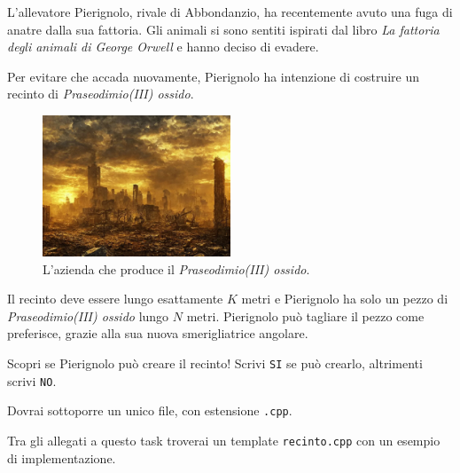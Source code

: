 \usepackage{xcolor}
\usepackage{afterpage}
\usepackage{pifont,mdframed}
\usepackage[bottom]{footmisc}
\usepackage{minted}

\newcommand{\inputfile}{\texttt{stdin}}
\newcommand{\outputfile}{\texttt{stdout}}
\makeatletter
\renewcommand{\this@inputfilename}{\texttt{stdin}}
\renewcommand{\this@outputfilename}{\texttt{stdout}}
\renewcommand{\this@syllabuslevel}{5}
\renewcommand{\this@custdifficulty}{3}
\makeatother
{}

L'allevatore Pierignolo, rivale di Abbondanzio, ha recentemente avuto una fuga di anatre dalla sua fattoria.
Gli animali si sono sentiti ispirati dal libro \textit{La fattoria degli animali di George Orwell} e hanno
deciso di evadere.

Per evitare che accada nuovamente, Pierignolo ha intenzione di costruire un recinto di \textit{Praseodimio(III) ossido}.

\begin{figure}[h]
    \centering
    \includegraphics[width=0.5\textwidth]{toxic.png}
    \caption{L'azienda che produce il \textit{Praseodimio(III) ossido}.}
\end{figure}

Il recinto deve essere lungo esattamente $K$ metri e Pierignolo ha solo un pezzo di \textit{Praseodimio(III) ossido} lungo $N$ metri.
Pierignolo può tagliare il pezzo come preferisce, grazie alla sua nuova smerigliatrice angolare.

Scopri se Pierignolo può creare il recinto! Scrivi \texttt{SI} se può crearlo, altrimenti scrivi \texttt{NO}.


\Implementation

Dovrai sottoporre un unico file, con estensione \texttt{.cpp}.

\begin{warning}
    Tra gli allegati a questo task troverai un template \texttt{recinto.cpp} con un esempio di implementazione.
\end{warning}

